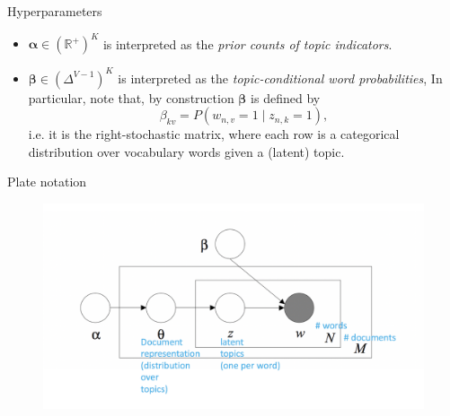 \documentclass[10pt]{beamer}
\newcommand{\R}{\mathbb{R}}
\newcommand{\+}[1]{\ensuremath{{\boldsymbol #1}}} %
\newcommand{\cond}{\; | \;}
\begin{document}
\begin{frame}{Hyperparameters}

\begin{itemize}

\item $\+\alpha \in (\R^+)^K$ is interpreted as the \textit{prior  counts of topic indicators}.

\item  $\+\beta \in (\Delta^{V-1})^K$ is interpreted as the \textit{topic-conditional word probabilities},  In particular, note that, by construction $\+\beta$ is defined by 
\[\beta_{kv} = P(w_{n, v}= 1 \cond z_{n, k} = 1 ), \]
i.e. it is the right-stochastic matrix, where each row is a categorical distribution over vocabulary words given a (latent) topic. 

\end{itemize}

\end{frame}

\begin{frame}{Plate notation}

	\begin{figure}
	\includegraphics[width=\textwidth]{images/lda_generative.png}
	\end{figure}

\end{frame}
\end{document}
